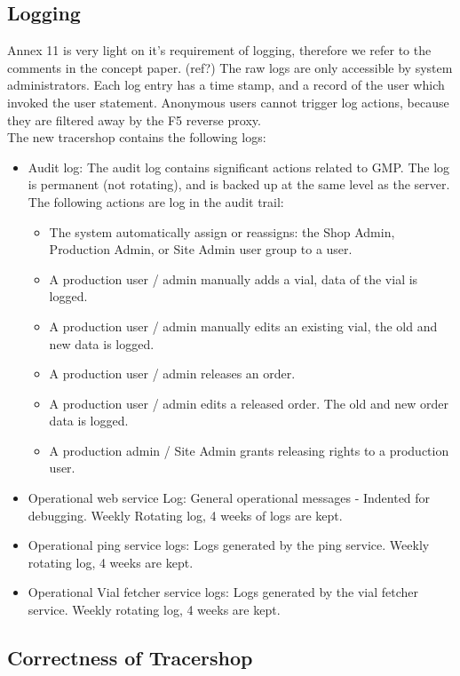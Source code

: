 \documentclass{article}
\begin{document}
\subsection*{Logging}
Annex 11 is very light on it's requirement of logging, therefore we refer to the
comments in the concept paper. (ref?)
The raw logs are only accessible by system administrators. Each log entry has a
time stamp, and a record of the user which invoked the user statement.
Anonymous users cannot trigger log actions, because they are filtered away by
the F5 reverse proxy.\\
The new tracershop contains the following logs:
\begin{itemize}
  \item Audit log: The audit log contains significant actions related to GMP.
  The log is permanent (not rotating), and is backed up at the same level as the
  server. The following actions are log in the audit trail:
  \begin{itemize}
    \item The system automatically assign or reassigns: the Shop Admin, Production Admin, or
    Site Admin user group to a user.
    \item A production user / admin manually adds a vial, data of the vial is
    logged.
    \item A production user / admin manually edits an existing vial, the old and
    new data is logged.
    \item A production user / admin releases an order.
    \item A production user / admin edits a released order. The old and new
    order data is logged.
    \item A production admin / Site Admin grants releasing rights to a
    production user.
  \end{itemize}
  \item Operational web service Log: General operational messages - Indented for
  debugging. Weekly Rotating log, 4 weeks of logs are kept.
  \item Operational ping service logs: Logs generated by the ping service.
  Weekly rotating log, 4 weeks are kept.
  \item Operational Vial fetcher service logs: Logs generated by the vial
  fetcher service. Weekly rotating log, 4 weeks are kept.
\end{itemize}


\subsection*{Correctness of Tracershop}
\end{document}

